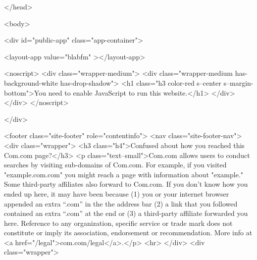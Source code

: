 </head>

<body>

<div id="public-app" class="app-container">

        
        <layout-app
        value="blabfm"
    ></layout-app>


        <noscript>
            <div class="wrapper-medium">
                <div class="wrapper-medium has-background-white has-drop-shadow">
                    <h1 class="h3 color-red s--center s--margin-bottom">You need to enable JavaScript to run this website.</h1>
                </div>
            </div>
        </noscript>

    </div>

    
        <footer class="site-footer" role="contentinfo">
    <nav class="site-footer-nav">
                    <div class="wrapper">
                <h3 class="h4">Confused about how you reached this Com.com page?</h3>
                <p class="text--small">Com.com allows users to conduct searches by visiting sub-domains of Com.com. For example, if you visited "example.com.com" you might reach a page with information about "example." Some third-party affiliates also forward to Com.com. If you don't know how you ended up here, it may have been because (1) you or your internet browser appended an extra “.com” in the the address bar (2) a link that you followed contained an extra “.com” at the end or (3) a third-party affiliate forwarded you here. Reference to any organization, specific service or trade mark does not constitute or imply its association, endorsement or recommendation. More info at <a href="/legal">com.com/legal</a>.</p>
                <hr>
            </div>
                <div class="wrapper">

